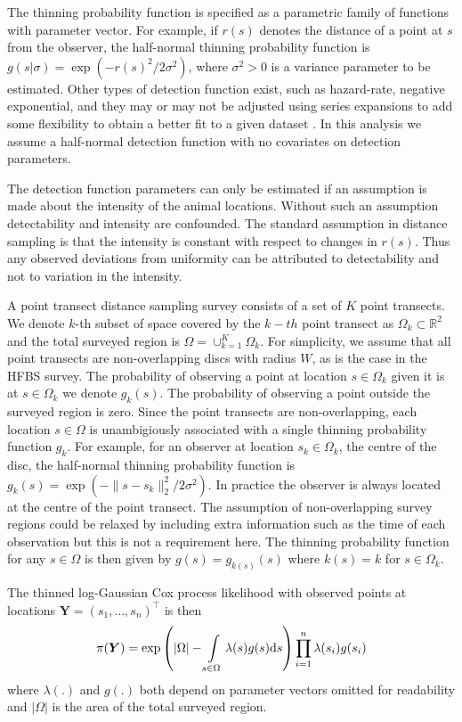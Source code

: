 \documentclass{stylefile16/statsoc}
\newcommand{\bm}{\boldsymbol}  %
\begin{document}
The thinning probability function is specified as a parametric family of functions with parameter vector.  For example, if $r(s)$ denotes the distance of a point at $s$ from the observer, the half-normal thinning probability function is $g(s | \sigma) = \exp(-r(s)^2 / 2\sigma^2)$, where $\sigma^2 > 0$ is a variance parameter to be estimated.  Other types of detection function exist, such as hazard-rate, negative exponential, and they may or may not be adjusted using series expansions to add some flexibility to obtain a better fit to a given dataset \citep{buckland_distance_2015}.  In this analysis we assume a half-normal detection function with no covariates on detection parameters.

The detection function parameters can only be estimated if an assumption is made about the intensity of the animal locations.  Without such an assumption detectability and intensity are confounded.  The standard assumption in distance sampling is that the intensity is constant with respect to changes in $r(s)$.  Thus any observed deviations from uniformity can be attributed to detectability and not to variation in the intensity.

A point transect distance sampling survey consists of a set of $K$ point transects.   We denote $k$-th subset of space covered by the $k-th$ point transect as $\Omega_k \subset \mathbb{R}^2$ and the total surveyed region is $\Omega = \cup_{k=1}^K \Omega_k$.  For simplicity, we assume that all point transects are non-overlapping discs with radius $W$, as is the case in the HFBS survey.  The probability of observing a point at location $s \in \Omega_k$ given it is at $s \in \Omega_k$ we denote $g_k(s)$.  The probability of observing a point outside the surveyed region is zero.
Since the point transects are non-overlapping, each location $s \in \Omega$ is unambigiously associated with a single thinning probability function $g_k$.  For example, for an observer at location $s_k \in \Omega_k$, the centre of the disc, the half-normal thinning probability function is $g_k(s) = \exp(-\lVert s - s_k \rVert_2^2 / 2\sigma^2)$.  In practice the observer is always located at the centre of the point transect.  The assumption of non-overlapping survey regions could be relaxed by including extra information such as the time of each observation but this is not a requirement here.  The thinning probability function for any $s \in \Omega$ is then given by $g(s) = g_{k(s)}(s)$ where $k(s) = k$ for $s \in \Omega_k$.

The thinned log-Gaussian Cox process likelihood with observed points at locations $\bm{Y} = (s_1, \ldots, s_n)^\intercal$ is then
\begin{equation}
\label{lgcp-likelihood}
\pi(\bm{Y}) = \exp\left( |\Omega| -\int\displaylimits_{s \in \Omega} \lambda(s) g(s) \mathrm{d}s \right)\prod_{i=1}^n \lambda(s_i)g(s_i)
\end{equation}
where $\lambda(.)$ and $g(.)$ both depend on parameter vectors omitted for readability and $|\Omega|$ is the area of the total surveyed region.
\end{document}
